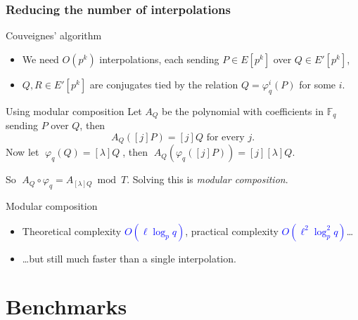 \documentclass[10pt]{beamer}
\newcommand{\blue}[1]{\textcolor{blue}{#1}}  %
\newcommand{\F}{\mathbb{F}}  %
\newcommand{\frob}{\varphi}  %
\newcommand{\0}{\mathcal{O}}  %
\begin{document}

\begin{frame}
  \frametitle{Reducing the number of interpolations}

  \begin{block}{Couveignes' algorithm}
    \begin{itemize}
    \item We need $O(p^k)$ interpolations, each sending $P\in E[p^k]$
      over $Q\in E'[p^k]$,
    \item $Q,R\in E'[p^k]$ are conjugates tied by the relation
      $Q=\frob_q^i(P)$ for some $i$.
    \end{itemize}
  \end{block}

  \begin{block}{Using modular composition}
    Let $A_Q$ be the polynomial with coefficients in $\F_q$ sending
    $P$ over $Q$, then
    \[A_Q([j]P) = [j]Q \text{ for every $j$.}\]
    Now let $\;\frob_q(Q) = [\lambda]Q\;$, then $\;A_Q(\frob_q([j]P)) =
    [j][\lambda]Q$.

    So \alert{$\;A_Q\circ\frob_q = A_{[\lambda]Q} \bmod T$}. Solving this
    is \emph{modular composition}.
  \end{block}

  \begin{block}{Modular composition}
    \begin{itemize}
    \item Theoretical complexity \blue{$O(\ell\log_pq)$}, practical
      complexity \blue{$O(\ell^2\log_p^2q)$}\dots
    \item \dots but still much faster than a single interpolation.
    \end{itemize}
  \end{block}
\end{frame}


\section{Benchmarks}
\end{document}
